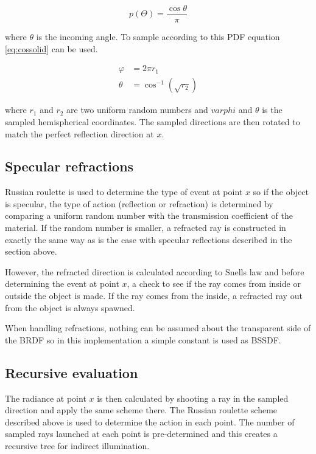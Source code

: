 \documentclass[a4paper]{report}
\begin{document}
\begin{equation}
  p(\Theta) = \frac{\cos{\theta}}{\pi}
\end{equation}

where \(\theta\) is the incoming angle. To sample according to this
PDF equation \ref{eq:cossolid} can be used.

\begin{align}
  \varphi &= 2 \pi r_1 \nonumber \\
  \theta &= \cos^{-1}(\sqrt{r_2})
  \label{eq:cossolid}
\end{align}

where \(r_1\) and \(r_2\) are two uniform random numbers and
\(varphi\) and \(\theta\) is the sampled hemispherical coordinates. The sampled
directions are then rotated to match the perfect reflection direction
at \(x\).

\subsection{Specular refractions}

Russian roulette is used to determine the type of event at point \(x\)
so if the object is specular, the type of action (reflection or
refraction) is determined by comparing a uniform random number with
the transmission coefficient of the material. If the random number is
smaller, a refracted ray is constructed in exactly the same way as is
the case with specular reflections described in the section above.

However, the refracted direction is calculated according to Snells law
and before determining the event at point \(x\), a check to see if the
ray comes from inside or outside the object is made. If the ray comes
from the inside, a refracted ray out from the object is always
spawned.

When handling refractions, nothing can be assumed about the
transparent side of the BRDF so in this implementation a simple
constant is used as BSSDF.

\subsection{Recursive evaluation}

The radiance at point \(x\) is then calculated by shooting a ray in
the sampled direction and apply the same scheme there. The Russian
roulette scheme described above is used to determine the action in
each point. The number of sampled rays launched at each point is
pre-determined and this creates a recursive tree for indirect illumination.
\end{document}
